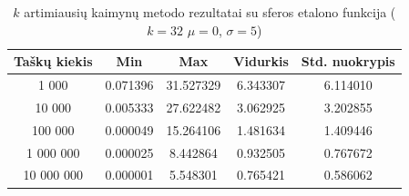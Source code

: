\begin{table}[H]
    \centering
    \begin{tabular}{|c|c|c|c|c|}
        \hline
        \textbf{Taškų kiekis} & \textbf{Min} & \textbf{Max} & \textbf{Vidurkis} & \textbf{Std. nuokrypis} \\ \hline
        1 000        & 0.071396 & 31.527329 & 6.343307 & 6.114010 \\ \hline
        10 000       & 0.005333 & 27.622482 & 3.062925 & 3.202855 \\ \hline
        100 000      & 0.000049 & 15.264106 & 1.481634 & 1.409446 \\ \hline
        1 000 000    & 0.000025 & 8.442864 & 0.932505 & 0.767672 \\ \hline
        10 000 000   & 0.000001 & 5.548301 & 0.765421 & 0.586062 \\ \hline
    \end{tabular}
    \caption{$k$ artimiausių kaimynų metodo rezultatai su sferos etalono funkcija ($k = 32$ $\mu = 0$, $\sigma = 5$)}
\end{table}